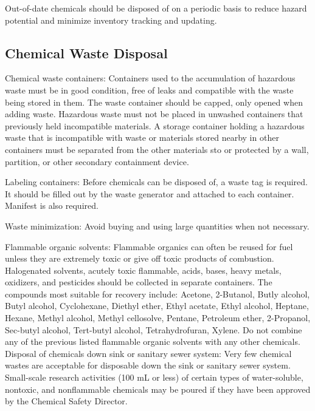 \documentclass[12pt]{../SOP2}
\begin{document}
\NP Out-of-date chemicals should be disposed of on a periodic basis to reduce hazard potential and minimize inventory tracking and updating.

\subsection*{Chemical Waste Disposal}

\NP Chemical waste containers: Containers used to the accumulation of hazardous waste must be in good condition, free of leaks and compatible with the waste being stored in them. The waste container should be capped, only opened when adding waste. Hazardous waste must not be placed in unwashed containers that previously held incompatible materials.  A storage container holding a hazardous waste that is incompatible with waste or materials stored nearby in other containers must be separated from the other materials  sto or protected by a wall, partition, or other secondary containment device. 

\NP Labeling containers: Before chemicals can be disposed of, a waste tag is required. It should be filled out by the waste generator and attached to each container. Manifest is also required. 

\NP Waste minimization: Avoid buying and using large quantities when not necessary. 

\NP Flammable organic solvents: Flammable organics can often be reused for fuel unless they are extremely toxic or give off toxic products of combustion. Halogenated solvents, acutely toxic flammable, acids, bases, heavy metals, oxidizers, and pesticides should be collected in separate containers. The compounds most suitable for recovery include: Acetone, 2-Butanol, Butly alcohol, Butyl alcohol, Cyclohexane, Diethyl ether, Ethyl acetate, Ethyl alcohol, Heptane, Hexane, Methyl alcohol, Methyl cellosolve, Pentane, Petroleum ether, 2-Propanol, Sec-butyl alcohol, Tert-butyl alcohol, Tetrahydrofuran, Xylene. Do not combine any of the previous listed flammable organic solvents with any other chemicals. 
Disposal of chemicals down sink or sanitary sewer system:
Very few chemical wastes are acceptable for disposable down the sink or sanitary sewer system. Small-scale research activities (100 mL or less) of certain types of water-soluble, nontoxic, and nonflammable chemicals may be poured if they have been approved by the Chemical Safety Director. 
\end{document}

